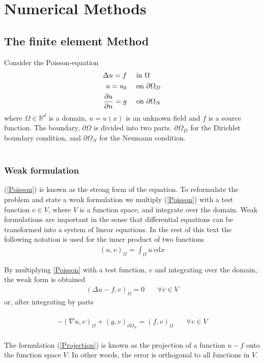 \chapter{Numerical Methods}
\section{The finite element Method}
Consider the Poisson-equation
\begin{align}
\Delta u = f & \quad \text{ in } \Omega \label{Poisson}\\
u = u_0 & \quad \text{ on } \partial \label{Poisson_D}\Omega_D \\
\frac{\partial u}{\partial n} = g & \quad \text{ on } \partial \Omega_N \label{Poisson_N}
\end{align}
where $\Omega \in \mathbb{R}^d$ is a domain, $ u = u(x)$ is an unknown field and $f$ is a source function. The boundary, $\partial \Omega$ is divided into two parts. $\partial \Omega_D$ for the Dirichlet boundary condition, and $\partial \Omega_N$ for the Neumann condition. 
\\
\\
\subsection{Weak formulation}
(\ref{Poisson}) is known as the strong form of the equation. To reformulate the problem and state a weak formulation we multiply (\ref{Poisson}) with a test function $v \in V$, where $V$ is a function space, and integrate over the domain. Weak formulations are important in the sense that differential equations can be transformed into a system of linear equations. In the rest of this text the following notation is used for the inner product of two functions
\begin{align} (u,v)_{\Omega} = \int_{\Omega} u \, v \mathrm{d}x \end{align}

By multiplying \ref{Poisson} with a test function, $v$ and integrating over the domain, the weak form is obtained
\begin{align}
(\Delta u - f, v)_\Omega = 0 & \quad \forall v \in V \label{Projection}
\end{align}
or, after integrating by parts \\ \\
\begin{align}
-(\nabla u, v)_\Omega + (g, v)_{\partial \Omega_N} = (f,v)_\Omega & \quad \forall v \in V \label{Weak_form}
\end{align}
\\
The formulation (\ref{Projection}) is known as the projection of a function $u - f$ onto the function space $V$. In other words, the error is orthogonal to all functions in $V$. 


